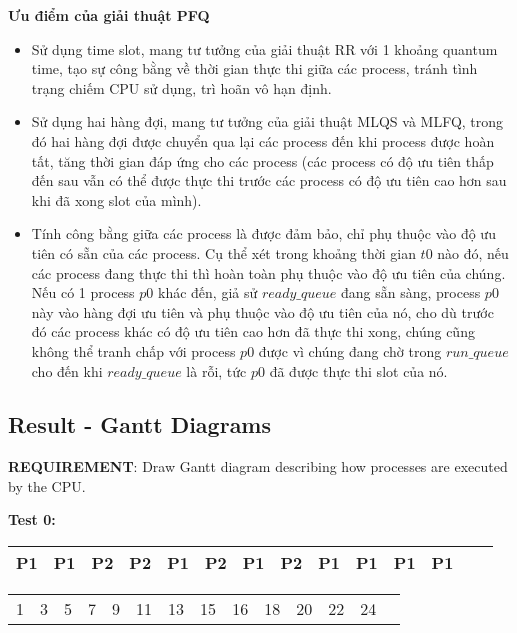 \vspace{0.5cm}

\textbf{Ưu điểm của giải thuật PFQ}

\vspace{0.5cm}

\begin{itemize}
	\item Sử dụng time slot, mang tư tưởng của giải thuật RR với 1 khoảng quantum time, tạo sự công bằng về thời gian thực thi giữa các process, tránh tình trạng chiếm CPU sử dụng, trì hoãn vô hạn định.
	\item Sử dụng hai hàng đợi, mang tư tưởng của giải thuật MLQS và MLFQ, trong đó hai hàng đợi được chuyển qua lại các process đến khi process được hoàn tất, tăng thời gian đáp ứng cho các process (các process có độ ưu tiên thấp đến sau vẫn có thể được thực thi trước các process có độ ưu tiên cao hơn sau khi đã xong slot của mình).
	\item Tính công bằng giữa các process là được đảm bảo, chỉ phụ thuộc vào độ ưu tiên có sẵn của các process. Cụ thể xét trong khoảng thời gian $ t0 $ nào đó, nếu các process đang thực thi thì hoàn toàn phụ thuộc vào độ ưu tiên của chúng. Nếu có 1 process $ p0 $ khác đến, giả sử $ ready\_queue $ đang sẵn sàng, process $ p0 $ này vào hàng đợi ưu tiên và phụ thuộc vào độ ưu tiên của nó, cho dù trước đó các process khác có độ ưu tiên cao hơn đã thực thi xong, chúng cũng không thể tranh chấp với process $ p0 $ được vì chúng đang chờ trong  $ run\_queue $ cho đến khi $ ready\_queue $ là rỗi, tức $ p0 $ đã được thực thi slot của nó.
\end{itemize}

\newpage

\subsection{Result - Gantt Diagrams}
\vspace{0.3cm}
\textbf{REQUIREMENT}: Draw Gantt diagram describing how processes are executed by the CPU.

\vspace{0.5cm}

\textbf{Test 0:}

\vspace{0.5cm}

\begin{table}[!htp]
    \centering            %
    \def\arraystretch{2}  %
    \begin{tabular}{|m{0.8cm}|m{0.8cm}|m{0.8cm}|m{0.8cm}|m{0.8cm}|m{0.8cm}|m{0.8cm}|m{0.4cm}|m{0.8cm}|m{0.8cm}|m{0.8cm}|m{0.8cm}|m{0.8cm}|c}
        \hline
        P1 & P1 & P2 & P2 & P1 & P2 & P1 & P2 & P1 & P1 & P1 & P1\\
        \hline
    \end{tabular}
    
    \begin{tabular}{m{0.8cm}m{0.8cm}m{0.8cm}m{0.8cm}m{0.8cm}m{0.8cm}m{0.8cm}m{0.8cm}m{0.8cm}m{0.8cm}m{0.8cm}m{0.8cm}m{0.8cm}l}
        1 & 3 & 5 & 7 & 9 & 11 & 13 & 15 & 16 & 18 & 20 & 22 & 24
    \end{tabular}
\end{table}

